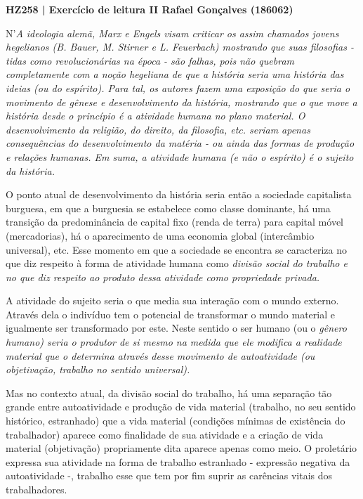 \documentclass[12pt]{article}
\begin{document}
\noindent
\large\textbf{HZ258 | Exercício de leitura II \hfill Rafael Gonçalves (186062)}
\break\hfill

N'\em A ideologia alemã\em, Marx e Engels visam criticar os assim chamados jovens hegelianos (B. Bauer, M. Stirner e L. Feuerbach) mostrando que suas filosofias - tidas como revolucionárias na época - são falhas, pois não quebram completamente com a noção hegeliana de que a história seria uma história das ideias (ou do espírito).
Para tal, os autores fazem uma exposição do que seria o movimento de gênese e desenvolvimento da história, mostrando que o que move a história desde o princípio é a \em atividade humana \em no plano material.
O desenvolvimento da religião, do direito, da filosofia, etc. seriam apenas consequências do desenvolvimento da matéria - ou ainda das formas de produção e relações humanas. Em suma, a atividade humana (e não o espírito) é o sujeito da história.

O ponto atual de desenvolvimento da história seria então a sociedade capitalista burguesa, em que a burguesia se estabelece como classe dominante, há uma transição da predominância de capital fixo (renda de terra) para capital móvel (mercadorias), há o aparecimento de uma economia global (intercâmbio universal), etc.
Esse momento em que a sociedade se encontra se caracteriza no que diz respeito à forma de atividade humana como \em divisão social do trabalho \em e no que diz respeito ao produto dessa atividade como \em propriedade privada\em .

A atividade do sujeito seria o que media sua interação com o mundo externo. Através dela o indivíduo tem o potencial de transformar o mundo material e igualmente ser transformado por este. Neste sentido o ser humano (ou o \em gênero humano\em) seria o produtor de si mesmo na medida que ele modifica a realidade material que o determina através desse movimento de autoatividade (ou objetivação, trabalho no sentido universal).

Mas no contexto atual, da divisão social do trabalho, há uma separação tão grande entre autoatividade e produção de vida material (trabalho, no seu sentido histórico, estranhado) que a vida material (condições mínimas de existência do trabalhador) aparece como finalidade de sua atividade e a criação de vida material (objetivação) propriamente dita aparece apenas como meio.
O proletário expressa sua atividade na forma de trabalho estranhado - expressão negativa da autoatividade -, trabalho esse que tem por fim suprir as carências vitais dos trabalhadores.
\end{document}

